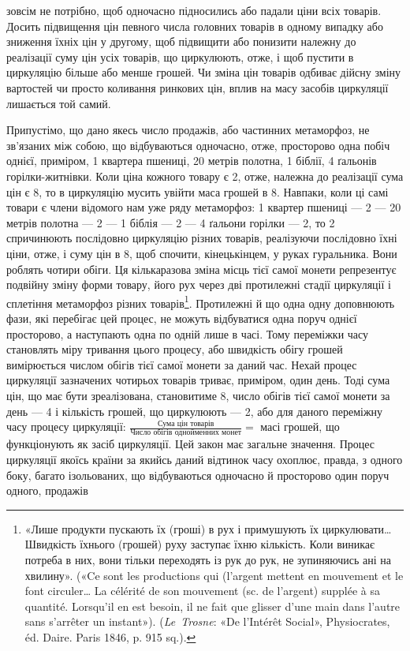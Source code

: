 \parcont{}  %
зовсім не потрібно, щоб одночасно підносились або падали ціни
всіх товарів. Досить підвищення цін певного числа головних
товарів в одному випадку або зниження їхніх цін у другому,
щоб підвищити або понизити належну до реалізації суму цін
усіх товарів, що циркулюють, отже, і щоб пустити в циркуляцію
більше або менше грошей. Чи зміна цін товарів одбиває дійсну
зміну вартостей чи просто коливання ринкових цін, вплив на
масу засобів циркуляції лишається той самий.

Припустімо, що дано якесь число продажів, або частинних
метаморфоз, не зв’язаних між собою, що відбуваються одночасно,
отже, просторово одна побіч однієї, приміром, 1 квартера пшениці,
20 метрів полотна, 1 біблії, 4 ґальонів горілки-житнівки. Коли
ціна кожного товару є 2, отже, належна до реалізації
сума цін є 8, то в циркуляцію мусить
увійти маса грошей в 8. Навпаки, коли ці самі
товари є члени відомого нам уже ряду метаморфоз: 1 квартер
пшениці — 2 — 20 метрів полотна — 2 — 1 біблія — 2 — 4 ґальони горілки —
2, то 2 спричинюють послідовно
циркуляцію різних товарів, реалізуючи послідовно їхні
ціни, отже, і суму цін в 8, щоб спочити, кінецькінцем,
у руках гуральника. Вони роблять чотири обіги. Ця
кількаразова зміна місць тієї самої монети репрезентує подвійну
зміну форми товару, його рух через дві протилежні стадії циркуляції
і сплетіння метаморфоз різних товарів\footnote{
«Лише продукти пускають їх (гроші) в рух і примушують їх
циркулювати\dots{} Швидкість їхнього (грошей) руху заступає їхню кількість.
Коли виникає потреба в них, вони тільки переходять із рук до рук, не
зупиняючись ані на хвилину». («Ce sont les productions qui (l’argent
mettent en mouvement et le font circuler\dots{} La célérité de son mouvement
(sc. de l’argent) supplée à sa quantité. Lorsqu’il en est besoin, il ne fait
que glisser d’une main dans l’autre sans s’arrêter un instant»). (\emph{Le~Trosne}:
«De l’Intérêt Social», Physiocrates, éd. Daire. Paris 1846, p. 915 sq.).
}. Протилежні й
що одна одну доповнюють фази, які перебігає цей процес, не можуть
відбуватися одна поруч однієї просторово, а наступають
одна по одній лише в часі. Тому переміжки часу становлять міру
тривання цього процесу, або швидкість обігу грошей вимірюється
числом обігів тієї самої монети за даний час. Нехай процес
циркуляції зазначених чотирьох товарів триває, приміром, один
день. Тоді сума цін, що має бути зреалізована, становитиме
8, число обігів тієї самої монети за день — 4
і кількість грошей, що циркулюють — 2, або
для даного переміжну часу процесу циркуляції:
$\frac{\text{Сума цін товарів}}{\text{Число обігів однойменних монет}} =$
масі грошей, що функціонують
як засіб циркуляції. Цей закон має загальне значення.
Процес циркуляції якоїсь країни за якийсь даний відтинок часу
охоплює, правда, з одного боку, багато ізольованих, що відбуваються
одночасно й просторово один поруч одного, продажів
\parbreak{}  %

